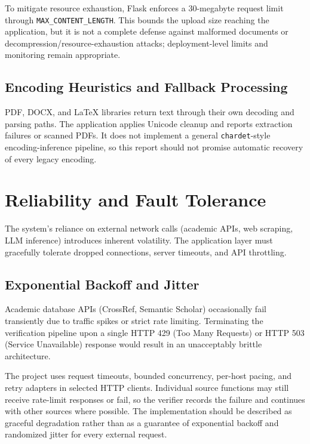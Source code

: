 \documentclass[12pt,a4paper,oneside]{report}
\begin{document}
To mitigate resource exhaustion, Flask enforces a 30-megabyte request limit through \texttt{MAX\_CONTENT\_LENGTH}. This bounds the upload size reaching the application, but it is not a complete defense against malformed documents or decompression/resource-exhaustion attacks; deployment-level limits and monitoring remain appropriate.

\subsection{Encoding Heuristics and Fallback Processing}

PDF, DOCX, and LaTeX libraries return text through their own decoding and parsing paths. The application applies Unicode cleanup and reports extraction failures or scanned PDFs. It does not implement a general \texttt{chardet}-style encoding-inference pipeline, so this report should not promise automatic recovery of every legacy encoding.

\section{Reliability and Fault Tolerance}

The system's reliance on external network calls (academic APIs, web scraping, LLM inference) introduces inherent volatility. The application layer must gracefully tolerate dropped connections, server timeouts, and API throttling.

\subsection{Exponential Backoff and Jitter}

Academic database APIs (CrossRef, Semantic Scholar) occasionally fail transiently due to traffic spikes or strict rate limiting. Terminating the verification pipeline upon a single HTTP 429 (Too Many Requests) or HTTP 503 (Service Unavailable) response would result in an unacceptably brittle architecture.

The project uses request timeouts, bounded concurrency, per-host pacing, and retry adapters in selected HTTP clients. Individual source functions may still receive rate-limit responses or fail, so the verifier records the failure and continues with other sources where possible. The implementation should be described as graceful degradation rather than as a guarantee of exponential backoff and randomized jitter for every external request.
\end{document}
